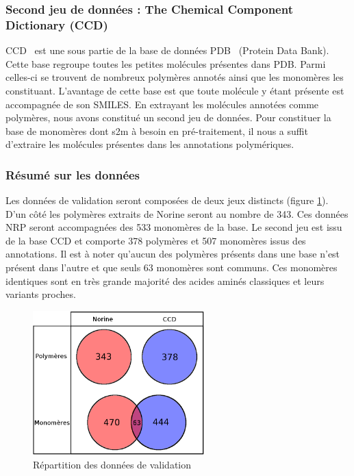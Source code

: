 \subsubsection{Second jeu de données : The Chemical Component Dictionary (CCD)}

CCD~\cite{westbrook_chemical_2015} est une sous partie de la base de données PDB~\cite{berman_protein_2000} (Protein Data Bank).
Cette base regroupe toutes les petites molécules présentes dans PDB.
Parmi celles-ci se trouvent de nombreux polymères annotés ainsi que les monomères les constituant.
L'avantage de cette base est que toute molécule y étant présente est accompagnée de son SMILES.
En extrayant les molécules annotées comme polymères, nous avons constitué un second jeu de données.
Pour constituer la base de monomères dont s2m à besoin en pré-traitement, il nous a suffit d'extraire les molécules présentes dans les annotations polymériques.


\subsubsection{Résumé sur les données}

Les données de validation seront composées de deux jeux distincts (figure \ref{data}).
D'un côté les polymères extraits de Norine seront au nombre de 343.
Ces données NRP seront accompagnées des 533 monomères de la base.
Le second jeu est issu de la base CCD et comporte 378 polymères et 507 monomères issus des annotations.
Il est à noter qu'aucun des polymères présents dans une base n'est présent dans l'autre et que seuls 63 monomères sont communs.
Ces monomères identiques sont en très grande majorité des acides aminés classiques et leurs variants proches.

\begin{figure}[!ht]
  \begin{center}
    \includegraphics[width=250px]{Figures/s2m/results/data.png}
    \caption{\label{data}Répartition des données de validation}
  \end{center}
\end{figure}




